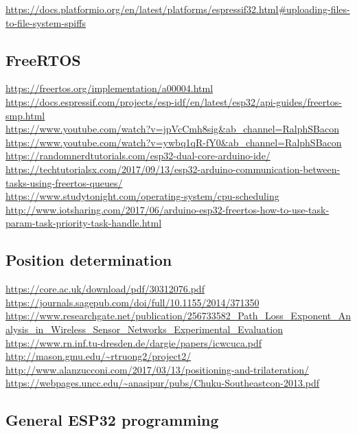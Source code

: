 \documentclass[11pt,a4paper]{article}
\numberwithin{equation}{section}   %
\numberwithin{figure}{section}     %
\numberwithin{table}{section}      %
\begin{document}
\url{https://docs.platformio.org/en/latest/platforms/espressif32.html#uploading-files-to-file-system-spiffs}


\subsection{FreeRTOS}

\url{https://freertos.org/implementation/a00004.html}\\[4pt]
\url{https://docs.espressif.com/projects/esp-idf/en/latest/esp32/api-guides/freertos-smp.html}\\[4pt]
\url{https://www.youtube.com/watch?v=jpVcCmh8sig&ab_channel=RalphSBacon}\\[4pt]
\url{https://www.youtube.com/watch?v=ywbq1qR-fY0&ab_channel=RalphSBacon}\\[4pt]
\url{https://randomnerdtutorials.com/esp32-dual-core-arduino-ide/}\\[4pt]
\url{https://techtutorialsx.com/2017/09/13/esp32-arduino-communication-between-tasks-using-freertos-queues/}\\[4pt]
\url{https://www.studytonight.com/operating-system/cpu-scheduling}\\[4pt]
\url{http://www.iotsharing.com/2017/06/arduino-esp32-freertos-how-to-use-task-param-task-priority-task-handle.html}


\subsection{Position determination}

\url{https://core.ac.uk/download/pdf/30312076.pdf}\\[4pt]
\url{https://journals.sagepub.com/doi/full/10.1155/2014/371350}\\[4pt]
\url{https://www.researchgate.net/publication/256733582_Path_Loss_Exponent_Analysis_in_Wireless_Sensor_Networks_Experimental_Evaluation}\\[4pt]
\url{https://www.rn.inf.tu-dresden.de/dargie/papers/icwcuca.pdf}\\[4pt]
\url{http://mason.gmu.edu/~rtruong2/project2/}\\[4pt]
\url{http://www.alanzucconi.com/2017/03/13/positioning-and-trilateration/}\\[4pt]
\url{https://webpages.uncc.edu/~anasipur/pubs/Chuku-Southeastcon-2013.pdf}


\subsection{General ESP32 programming}
\end{document}
